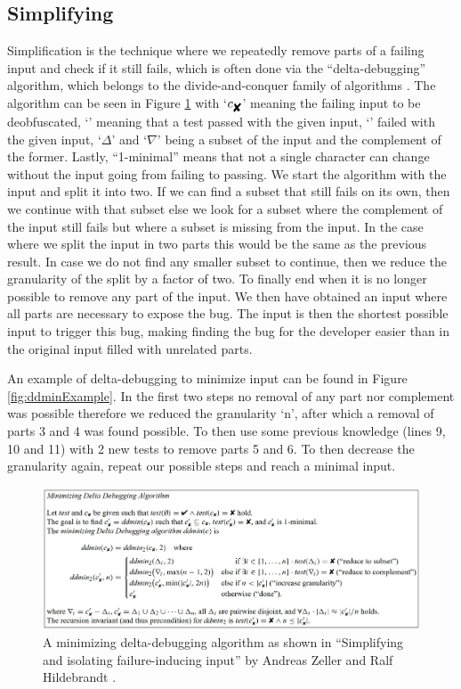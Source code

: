 \subsection{Simplifying}
\label{inputReduction:Simplifying}
Simplification is the technique where we repeatedly remove parts of a failing input and check if it still fails, which is often done via the “delta-debugging” algorithm, which belongs to the divide-and-conquer family of algorithms \cite{2FuzzingAndDeltaDebuggingSMTSolvers}. 
The algorithm can be seen in Figure \ref{fig:ddmin} with 
‘$ c_{\mbox{\ding{56}}} $’  %
meaning the failing input to be deobfuscated,
‘’ %
meaning that a test passed with the given input,
‘’ %
failed with the given input, 
‘$\Delta$’ and ‘$\nabla$’ being a subset of the input and the complement of the former.
Lastly, “1-minimal” means that not a single character can change without the input going from failing to passing. 
We start the algorithm with the input and split it into two. If we can find a subset that still fails on its own, then we continue with that subset else we look for a subset where the complement of the input still fails but where a subset is missing from the input. In the case where we split the input in two parts this would be the same as the previous result. In case we do not find any smaller subset to continue, then we reduce the granularity of the split by a factor of two. To finally end when it is no longer possible to remove any part of the input. We then have obtained an input where all parts are necessary to expose the bug. The input is then the shortest possible input to trigger this bug, making finding the bug for the developer easier than in the original input filled with unrelated parts. 

An example of delta-debugging to minimize input can be found in Figure \ref{fig:ddminExample}. In the first two steps no removal of any part nor complement was possible therefore we reduced the granularity ‘n’, after which a removal of parts 3 and 4 was found possible. To then use some previous knowledge (lines 9, 10 and 11) with 2 new tests to remove parts 5 and 6. To then decrease the granularity again, repeat our possible steps and reach a minimal input.

\begin{figure}
	\centering
	\includegraphics[width=1.0\textwidth]{images/ddminFromPaper5edit}
	\caption{A minimizing delta-debugging algorithm as shown in “Simplifying and isolating failure-inducing input” by Andreas Zeller and Ralf Hildebrandt \cite{5zeller2002simplifyingIsolatingFailure-inducing}.}
	\label{fig:ddmin}
\end{figure}

